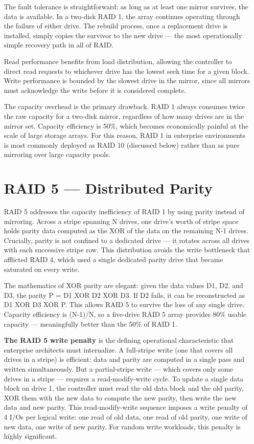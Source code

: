 The fault tolerance is straightforward: as long as at least one mirror survives, the data is available. In a two-disk RAID 1, the array continues operating through the failure of either drive. The rebuild process, once a replacement drive is installed, simply copies the survivor to the new drive --- the most operationally simple recovery path in all of RAID.

Read performance benefits from load distribution, allowing the controller to direct read requests to whichever drive has the lowest seek time for a given block. Write performance is bounded by the slowest drive in the mirror, since all mirrors must acknowledge the write before it is considered complete.

The capacity overhead is the primary drawback. RAID 1 always consumes twice the raw capacity for a two-disk mirror, regardless of how many drives are in the mirror set. Capacity efficiency is 50\%, which becomes economically painful at the scale of large storage arrays. For this reason, RAID 1 in enterprise environments is most commonly deployed as RAID 10 (discussed below) rather than as pure mirroring over large capacity pools.

\section{RAID 5 --- Distributed Parity}
RAID 5 addresses the capacity inefficiency of RAID 1 by using parity instead of mirroring. Across a stripe spanning N drives, one drive's worth of stripe space holds parity data computed as the XOR of the data on the remaining N-1 drives. Crucially, parity is not confined to a dedicated drive --- it rotates across all drives with each successive stripe row. This distribution avoids the write bottleneck that afflicted RAID 4, which used a single dedicated parity drive that became saturated on every write.

The mathematics of XOR parity are elegant: given the data values D1, D2, and D3, the parity P = D1 XOR D2 XOR D3. If D2 fails, it can be reconstructed as D1 XOR D3 XOR P. This allows RAID 5 to survive the loss of any single drive. Capacity efficiency is (N-1)/N, so a five-drive RAID 5 array provides 80\% usable capacity --- meaningfully better than the 50\% of RAID 1.

\textbf{The RAID 5 write penalty} is the defining operational characteristic that enterprise architects must internalize. A full-stripe write (one that covers all drives in a stripe) is efficient: data and parity are computed in a single pass and written simultaneously. But a partial-stripe write --- which covers only some drives in a stripe --- requires a read-modify-write cycle. To update a single data block on drive 1, the controller must read the old data block and the old parity, XOR them with the new data to compute the new parity, then write the new data and new parity. This read-modify-write sequence imposes a write penalty of 4 I/Os per logical write: one read of old data, one read of old parity, one write of new data, one write of new parity. For random write workloads, this penalty is highly significant.

